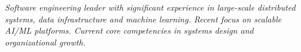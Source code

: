 {\selectfont
	\begin{justify}\textit{Software engineering leader with significant experience in large-scale distributed systems, data infrastructure and machine learning. Recent focus on scalable AI/ML platforms. Current core competencies in systems design and organizational growth.}\end{justify}
}